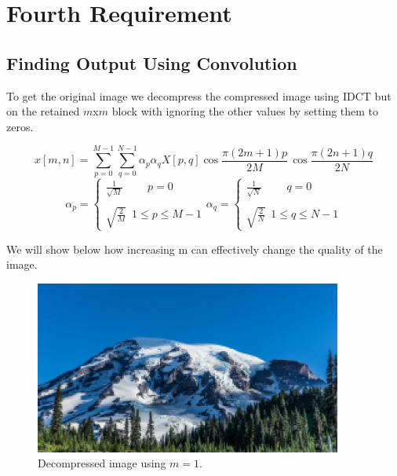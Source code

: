 \chapter{Fourth Requirement}
\section{Finding Output  Using Convolution}
To get the original image we decompress the compressed image using IDCT but on the retained $m$x$m$ block with ignoring the other values by setting them to zeros.

\begin{tcolorbox}[colback=green!8!white,colframe=green!40!black,title=\textbf{Inverse Discrete Cosines Transform}]
    $$x\left[m,n\right] =  \sum_{p=0}^{M-1}\sum_{q=0}^{N-1}\alpha_p \alpha_q X[p,q] \cos{\frac{\pi \left(2m+1\right)p}{2M}} \, \cos{\frac{\pi \left(2n+1\right)q}{2N}}$$
    $$\alpha_p = \begin{cases}
        \frac{1}{\sqrt{M}}\hspace{27pt} p=0 \\\\
        \sqrt{\frac{2}{M}}\,\,\, 1 \leq p \leq M - 1
    \end{cases}
    \alpha_q = \begin{cases}
        \frac{1}{\sqrt{N}}\hspace{27pt} q=0 \\\\
        \sqrt{\frac{2}{N}}\,\,\, 1 \leq q \leq N - 1
    \end{cases}
    $$
\end{tcolorbox}
\vspace{5pt}

\noindent We will show below how increasing m can effectively change the quality of the image.

\begin{figure}[h]
    \centering
    \includegraphics[width=0.9\textwidth]{../Decompressed Images/decompressedImage_m1.png}
    \caption{Decompressed image using $m=1$.}
    \label{fig:decompressed_img_m1}
\end{figure}

